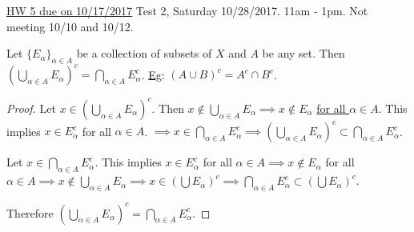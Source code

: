 \documentclass[]{article}
\begin{document}
\ul{HW 5 due on 10/17/2017} Test 2, Saturday 10/28/2017. 11am - 1pm. Not meeting 10/10 and 10/12.

\begin{theorem}
	Let $\{E_\alpha\}_{\alpha\in A}$ be a collection of subsets of $X$ and $A$ be any set.
	Then $\left( \bigcup_{\alpha\in A} E_\alpha\right)^c = \bigcap_{\alpha\in A} E_\alpha^c$. \ul{Eg}: $(A\cup B)^c = A^c\cap B^c$.
\end{theorem}
\begin{proof}
	\say{$\subset$} Let $x\in\left(\bigcup_{\alpha\in A} E_\alpha\right)^c$. Then $x\notin \bigcup_{\alpha\in A} E_\alpha \implies x \notin E_\alpha$  \ul{for all $\alpha\in A$}.
	This implies $x\in E_\alpha^c$ for all $\alpha\in A$. $\implies x\in \bigcap_{\alpha\in A} E_\alpha^c \implies \left(\bigcup_{\alpha\in A} E_\alpha\right)^c \subset \bigcap_{\alpha\in A} E_\alpha^c$.
	
	\say{$\supset$} Let $x\in \bigcap_{\alpha\in A} E_\alpha^c$. This implies $x\in E_\alpha^c$ for all $\alpha \in A \implies x\notin E_\alpha$ for all $\alpha \in A \implies x\notin \bigcup_{\alpha\in A} E_\alpha \implies x\in\left( \bigcup E_\alpha \right)^c \implies \bigcap_{\alpha\in A} E_\alpha^c \subset(\bigcup E_\alpha )^c$.
	
	Therefore  $\left(\bigcup_{\alpha\in A}E_\alpha\right)^c = \bigcap_{\alpha\in A} E_\alpha^c$.
\end{proof}
\end{document}

